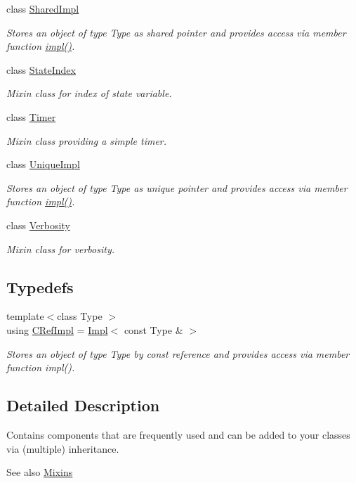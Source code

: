 \begin{DoxyCompactItemize}
class \hyperlink{classSpacy_1_1Mixin_1_1SharedImpl}{Shared\+Impl}
\begin{DoxyCompactList}\small\item\em Stores an object of type Type as shared pointer and provides access via member function \hyperlink{classSpacy_1_1Mixin_1_1SharedImpl_a4bed4faca68901d0dd463c4234fb2fe6}{impl()}. \end{DoxyCompactList}\item 
class \hyperlink{classSpacy_1_1Mixin_1_1StateIndex}{State\+Index}
\begin{DoxyCompactList}\small\item\em Mixin class for index of state variable. \end{DoxyCompactList}\item 
class \hyperlink{classSpacy_1_1Mixin_1_1Timer}{Timer}
\begin{DoxyCompactList}\small\item\em Mixin class providing a simple timer. \end{DoxyCompactList}\item 
class \hyperlink{classSpacy_1_1Mixin_1_1UniqueImpl}{Unique\+Impl}
\begin{DoxyCompactList}\small\item\em Stores an object of type Type as unique pointer and provides access via member function \hyperlink{classSpacy_1_1Mixin_1_1UniqueImpl_ae183ae8b045db161111f761a32703547}{impl()}. \end{DoxyCompactList}\item 
class \hyperlink{classSpacy_1_1Mixin_1_1Verbosity}{Verbosity}
\begin{DoxyCompactList}\small\item\em Mixin class for verbosity. \end{DoxyCompactList}\end{DoxyCompactItemize}
\subsection*{Typedefs}
\begin{DoxyCompactItemize}
\item 
\hypertarget{group__MixinGroup_ga3289264a84ff7bc4942d07318a22bfd7}{}{\footnotesize template$<$class Type $>$ }\\using \hyperlink{group__MixinGroup_ga3289264a84ff7bc4942d07318a22bfd7}{C\+Ref\+Impl} = \hyperlink{classSpacy_1_1Mixin_1_1Impl}{Impl}$<$ const Type \& $>$\label{group__MixinGroup_ga3289264a84ff7bc4942d07318a22bfd7}

\begin{DoxyCompactList}\small\item\em Stores an object of type Type by const reference and provides access via member function impl(). \end{DoxyCompactList}\end{DoxyCompactItemize}


\subsection{Detailed Description}
Contains components that are frequently used and can be added to your classes via (multiple) inheritance. 

\begin{DoxySeeAlso}{See also}
\hyperlink{group__MixinGroup}{Mixins} 
\end{DoxySeeAlso}
